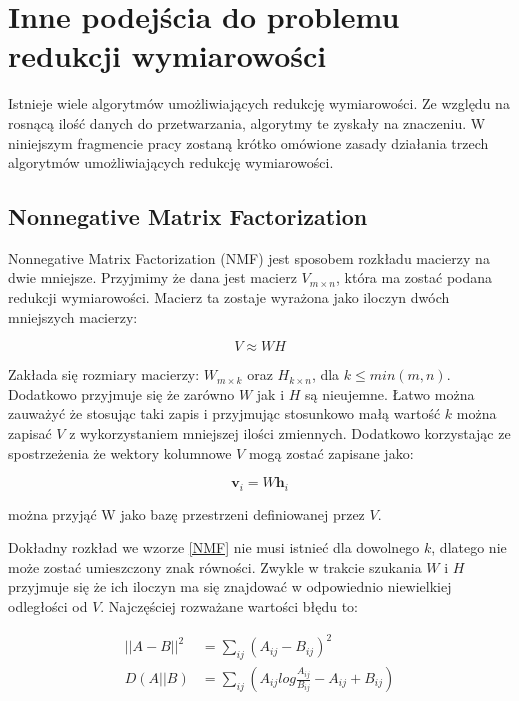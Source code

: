 \documentclass[oneside, eng]{mgr}
\newcommand{\bb}{\textbf}
\begin{document}
\section{Inne podejścia do problemu redukcji wymiarowości}
Istnieje wiele algorytmów umożliwiających redukcję wymiarowości. Ze względu na rosnącą ilość danych do przetwarzania, algorytmy te zyskały na znaczeniu. W niniejszym fragmencie pracy zostaną krótko omówione zasady działania trzech algorytmów umożliwiających redukcję wymiarowości.

\subsection{Nonnegative Matrix Factorization}

Nonnegative Matrix Factorization (NMF) jest sposobem rozkładu macierzy na dwie mniejsze. Przyjmimy że dana jest macierz $V_{m \times n}$, która ma zostać podana redukcji wymiarowości. Macierz ta zostaje wyrażona jako iloczyn dwóch mniejszych macierzy:

\begin{equation}
	V \approx WH
\label{NMF}
\end{equation}

Zakłada się rozmiary macierzy: $W_{m \times k}$ oraz $H_{k \times n}$, dla $k \leq min(m,n)$. Dodatkowo przyjmuje się że zarówno $W$ jak i $H$ są nieujemne. Łatwo można zauważyć że stosując taki zapis i przyjmując stosunkowo małą wartość $k$ można zapisać $V$ z wykorzystaniem mniejszej ilości zmiennych. Dodatkowo korzystając ze spostrzeżenia że wektory kolumnowe $V$ mogą zostać zapisane jako:

\begin{equation}
	\bb{v}_i = W \bb{h}_i
\end{equation}

można przyjąć W jako bazę przestrzeni definiowanej przez $V$.

Dokładny rozkład we wzorze \ref{NMF} nie musi istnieć dla dowolnego $k$, dlatego nie może zostać umieszczony znak równości. Zwykle w trakcie szukania $W$ i $H$ przyjmuje się że ich iloczyn ma się znajdować w odpowiednio niewielkiej odległości od $V$. Najczęściej rozważane wartości błędu to:

\begin{align*}
	||A - B||^2 &= \sum_{ij} (A_{ij} - B_{ij})^2 \\
	  D(A||B)   &= \sum_{ij} (A_{ij} log \frac{A_{ij}}{B_{ij}} - A_{ij} + B_{ij})
\end{align*}
\end{document}
